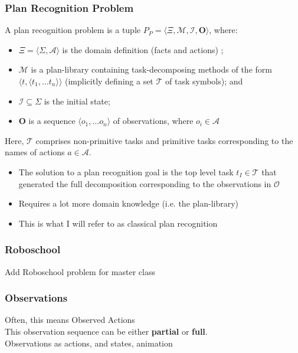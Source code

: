 \documentclass{beamer}
\newcommand{\todo}[1]{ {\color{red} #1} }
\begin{document}
	\begin{frame}[c]\frametitle{Plan Recognition Problem}
		\begin{definition}
			A plan recognition problem is a tuple $P_{P} = \langle \Xi, \mathcal{M}, \mathcal{I}, \mathbf{O} \rangle$, where:
	       	\begin{itemize}
	       		\item $\Xi = \langle \Sigma, \mathcal{A} \rangle$ is the domain definition (facts and actions) ;
				\item $\mathcal{M}$ is a plan-library containing task-decomposing methods of the form $\langle t, \langle t_1, \dots t_n \rangle \rangle$ (implicitly defining a set $\mathcal{T}$ of task symbols); and
	       		\item $\mathcal{I} \subseteq \Sigma$ is the initial state;
	       		\item $\mathbf{O}$ is a sequence $\langle o_1, \dots o_n \rangle$ of observations, where $o_i \in \mathcal{A}$
	       	\end{itemize}
			Here, $\mathcal{T}$ comprises non-primitive tasks and primitive tasks corresponding to the names of actions $a \in \mathcal{A}$.
		\end{definition}
		
		\begin{itemize}
			\item The solution to a plan recognition goal is the top level task $t_{I} \in \mathcal{T}$ that generated the full decomposition corresponding to the observations in $\mathcal{O}$
			\item Requires a lot more domain knowledge (i.e. the plan-library)
			\item This is what I will refer to as classical plan recognition 
		\end{itemize}
	\end{frame}
	
	\begin{frame}[c]\frametitle{Roboschool}
		{\color{red} Add Roboschool problem for master class}
	\end{frame}
	
	\begin{frame}[c]\frametitle{Observations}
		Often, this means Observed Actions\\
        This observation sequence can be either \textbf{partial} or \textbf{full}.\\
            \todo{Observations as actions, and states, animation}
	\end{frame}
	
\end{document}
